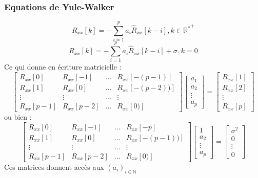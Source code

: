 \subsubsection{Equations de Yule-Walker}
\Large
\begin{equation}
    R_{xx}[k] = -\sum_{i=1}^{p}a_{i}\widehat{R}_{xx}[k-i], k \in {\mathbb{R}^{*}}^{+}
\end{equation}
\begin{equation}
    R_{xx}[k] = -\sum_{i=1}^{p}a_{i}\widehat{R}_{xx}[k-i] + \sigma^{}, k = 0
\end{equation}
\normalsize
\newpage
\noindent Ce qui donne en écriture matricielle :
\Large
\[
\begin{bmatrix}
    R_{xx}[0] & R_{xx}[-1] & \dots & R_{xx}[-(p-1)] \\
    R_{xx}[1] & R_{xx}[0]  & \dots & R_{xx}[-(p-2))] \\
    \vdots    & \vdots     & \ldots& \vdots \\ 
    R_{xx}[p-1] & R_{xx}[p-2] & \dots & R_{xx}[0)]
\end{bmatrix}
\begin{bmatrix}
    a_{1} \\
    a_{2} \\
    \vdots \\
    a_{p}
\end{bmatrix}
=
\begin{bmatrix}
    R_{xx}[1] \\
    R_{xx}[2] \\
    \vdots \\
    R_{xx}[p]
\end{bmatrix}
\]
\normalsize
ou bien :
\Large
\[
\begin{bmatrix}
    R_{xx}[0] & R_{xx}[-1] & \dots & R_{xx}[-p] \\
    R_{xx}[1] & R_{xx}[0]  & \dots & R_{xx}[-(p-1))] \\
    \vdots    & \vdots     & \ldots& \vdots \\ 
    R_{xx}[p-1] & R_{xx}[p-2] & \dots & R_{xx}[0)]
\end{bmatrix}
\begin{bmatrix}
    1 \\
    a_{2} \\
    \vdots \\
    a_{p}
\end{bmatrix}
=
\begin{bmatrix}
    \sigma^{2} \\
    0 \\
    \vdots \\
    0
\end{bmatrix}
\]
\normalsize
Ces matrices donnent accès aux $(a_{i})_{i \in \mathbb{N}}$